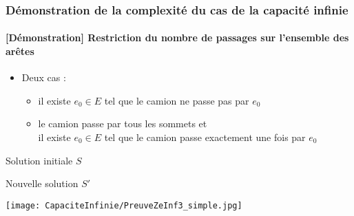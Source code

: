 \begin{frame}
  \frametitle{Démonstration de la complexité du cas de la capacité infinie}
  \framesubtitle{[Démonstration] Restriction du nombre de passages sur l'ensemble des arêtes}
  {
    \begin{itemize}
    \item<1-> Deux cas :
      \begin{itemize}
      \item<2-> il existe $e_0 \in E$ tel que le camion ne passe pas par $e_0$
      \item<3-> le camion passe par tous les sommets et\\
      il existe $e_0 \in E$ tel que le camion passe exactement une fois par $e_0$
      \end{itemize}
    \end{itemize}
  }
  {
    \begin{center}
      {
        \begin{minipage}[c]{.4\linewidth}
        \begin{center}
          Solution initiale $S$\\
          \begin{overlayarea}{\textwidth}{\textheight}
          \end{overlayarea}
        \end{center}
        \end{minipage} \hfill
      }
      {
        \begin{minipage}[c]{.4\linewidth}
        \begin{center}
          Nouvelle solution $S'$\\
          \begin{overlayarea}{\textwidth}{\textheight}
            \texttt{[image: CapaciteInfinie/PreuveZeInf3\_simple.jpg]}
          \end{overlayarea}
        \end{center}
        \end{minipage} \hfill
      }
    \end{center}
  }
\end{frame}
